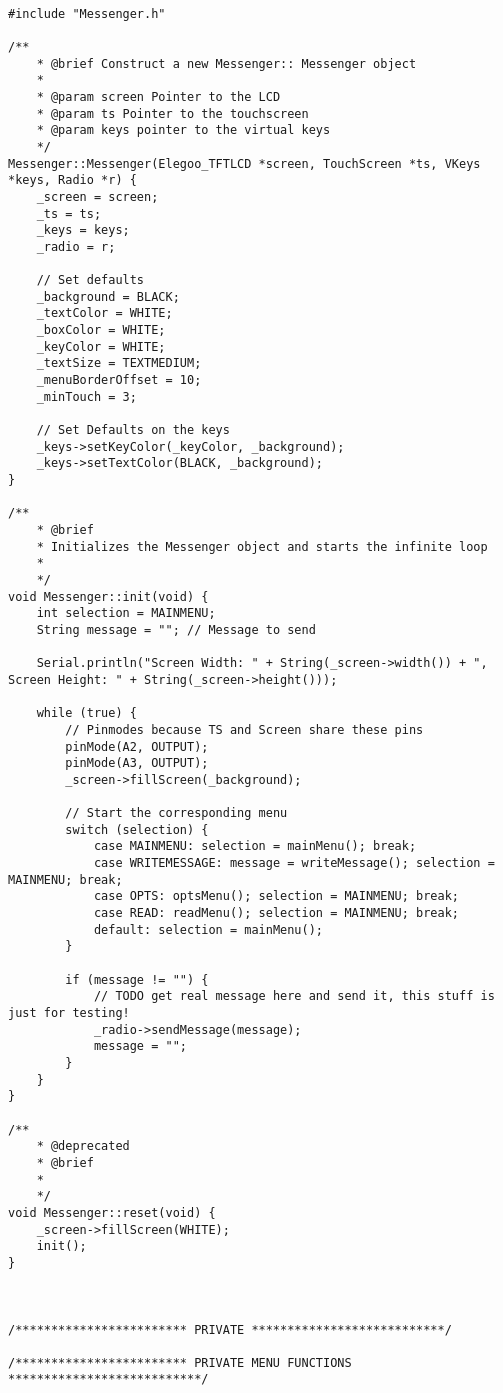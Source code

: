 \documentclass[a4paper, 11pt]{scrartcl}
\begin{document}
\begin{lstlisting}

#include "Messenger.h"

/**
    * @brief Construct a new Messenger:: Messenger object
    * 
    * @param screen Pointer to the LCD
    * @param ts Pointer to the touchscreen
    * @param keys pointer to the virtual keys
    */
Messenger::Messenger(Elegoo_TFTLCD *screen, TouchScreen *ts, VKeys *keys, Radio *r) {
    _screen = screen;
    _ts = ts;
    _keys = keys;
    _radio = r;

    // Set defaults
    _background = BLACK;
    _textColor = WHITE;
    _boxColor = WHITE;
    _keyColor = WHITE;
    _textSize = TEXTMEDIUM;
    _menuBorderOffset = 10;
    _minTouch = 3;

    // Set Defaults on the keys
    _keys->setKeyColor(_keyColor, _background);
    _keys->setTextColor(BLACK, _background);
}

/**
    * @brief 
    * Initializes the Messenger object and starts the infinite loop
    * 
    */
void Messenger::init(void) {
    int selection = MAINMENU;
    String message = ""; // Message to send

    Serial.println("Screen Width: " + String(_screen->width()) + ", Screen Height: " + String(_screen->height()));

    while (true) {
        // Pinmodes because TS and Screen share these pins
        pinMode(A2, OUTPUT);
        pinMode(A3, OUTPUT);
        _screen->fillScreen(_background);

        // Start the corresponding menu
        switch (selection) {
            case MAINMENU: selection = mainMenu(); break;
            case WRITEMESSAGE: message = writeMessage(); selection = MAINMENU; break;
            case OPTS: optsMenu(); selection = MAINMENU; break;
            case READ: readMenu(); selection = MAINMENU; break;
            default: selection = mainMenu(); 
        }

        if (message != "") {
            // TODO get real message here and send it, this stuff is just for testing!
            _radio->sendMessage(message);
            message = "";
        }
    }
}

/**
    * @deprecated
    * @brief 
    * 
    */
void Messenger::reset(void) {
    _screen->fillScreen(WHITE);
    init();
}



/************************ PRIVATE ***************************/

/************************ PRIVATE MENU FUNCTIONS ***************************/


\end{lstlisting}
\end{document}
